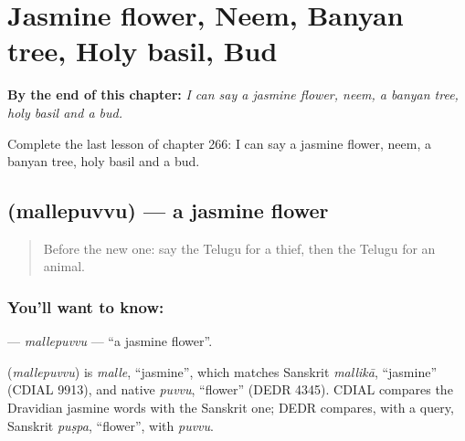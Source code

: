 
\chapter{Jasmine flower, Neem, Banyan tree, Holy basil, Bud}
\label{ch:te-jasmine-flower-neem-banyan-tree-holy-basil-bud}

\begin{chapteropening}
\textbf{By the end of this chapter:} \emph{I can say a jasmine flower, neem, a banyan tree, holy basil and a bud.}

Complete the last lesson of chapter 266: I can say a jasmine flower, neem, a banyan tree, holy basil and a bud.
\end{chapteropening}

\section[\texorpdfstring{\te{మల్లెపువ్వు} (mallepuvvu)}{మల్లెపువ్వు (mallepuvvu)}]{ (mallepuvvu) — a jasmine flower}

\label{lesson:TE-C266-mallepuvvu}



\begin{quote}
Before the new one: say the Telugu for a thief, then the Telugu for an animal.
\end{quote}

\subsection*{You'll want to know: }
\textbf{} — \emph{mallepuvvu} — \textquotedblleft{}a jasmine flower\textquotedblright{}.

\begin{cousinweb}
\textbf{} (\emph{mallepuvvu}) is \emph{malle}, \textquotedblleft{}jasmine\textquotedblright{}, which matches Sanskrit \emph{mallikā}, \textquotedblleft{}jasmine\textquotedblright{} (CDIAL 9913), and native \emph{puvvu}, \textquotedblleft{}flower\textquotedblright{} (DEDR 4345). CDIAL compares the Dravidian jasmine words with the Sanskrit one; DEDR compares, with a query, Sanskrit \emph{puṣpa}, \textquotedblleft{}flower\textquotedblright{}, with \emph{puvvu}.
\end{cousinweb}

